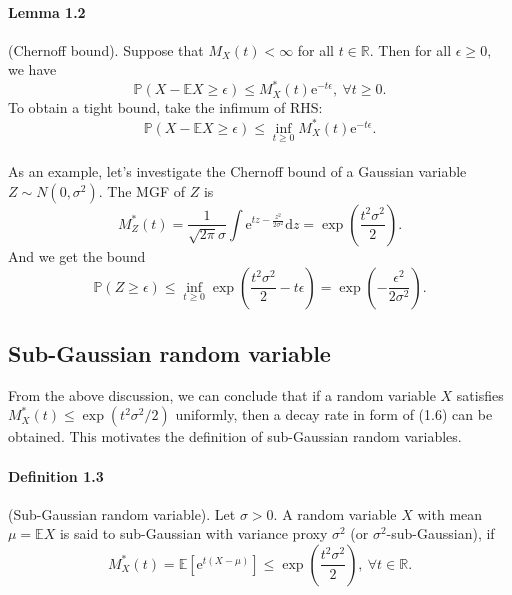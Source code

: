 \documentclass{article}
\newcommand{\E}{\mathbb{E}}
\begin{document}
\paragraph{Lemma 1.2} (Chernoff bound). Suppose that $M_X(t)<\infty$ for all $t\in\mathbb{R}.$ Then for all $\epsilon \geq 0,$ we have
\begin{equation*}
	\mathbb{P}(X - \E X \geq \epsilon)\leq M_X^*(t)\mathrm{e}^{-t\epsilon},\ \forall t\geq 0.\tag{1.3}
\end{equation*}
To obtain a tight bound, take the infimum of RHS: 
\begin{equation*}
	\mathbb{P}(X - \E X \geq \epsilon)\leq \inf_{t\geq 0} M_X^*(t)\mathrm{e}^{-t\epsilon}.\tag{1.4}
\end{equation*}

\paragraph{} As an example, let's investigate the Chernoff bound of a Gaussian variable $Z\sim N(0,\sigma^2).$ The MGF of $Z$ is
\begin{equation*}
	M_Z^*(t) = \frac{1}{\sqrt{2\pi}\sigma}\int\mathrm{e}^{tz-\frac{z^2}{2\sigma^2}}\mathrm{d}z = \exp\left(\frac{t^2\sigma^2}{2}\right).\tag{1.5}
\end{equation*}
And we get the bound
\begin{equation*}
	\mathbb{P}(Z\geq\epsilon) \leq \inf_{t\geq 0}\exp\left(\frac{t^2\sigma^2}{2} - t\epsilon\right) = \exp\left(-\frac{\epsilon^2}{2\sigma^2}\right).\tag{1.6}
\end{equation*}

\subsection{Sub-Gaussian random variable}
From the above discussion, we can conclude that if a random variable $X$ satisfies $M_X^*(t)\leq\exp\left(t^2\sigma^2/2\right)$ uniformly, then a decay rate in form of (1.6) can be obtained. This motivates the definition of sub-Gaussian random variables.
\paragraph{Definition 1.3} (Sub-Gaussian random variable). Let $\sigma > 0.$ A random variable $X$ with mean $\mu=\E X$ is said to sub-Gaussian with variance proxy $\sigma^2$ (or $\sigma^2$-sub-Gaussian), if
\begin{equation*}
	M_X^*(t) = \E[\mathrm{e}^{t(X-\mu)}] \leq \exp\left(\frac{t^2\sigma^2}{2}\right),\ \forall t\in\mathbb{R}.\tag{1.7}
\end{equation*}
\end{document}

